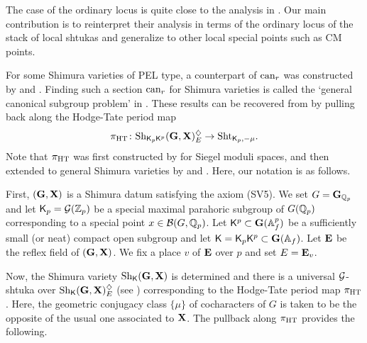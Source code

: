 \documentclass[12pt,reqno]{amsart}
\begin{document}
\begin{rmk}
    The case of the ordinary locus is quite close to the analysis in \cite[{}3.3.6]{BP21}. Our main contribution is to reinterpret their analysis in terms of the ordinary locus of the stack of local shtukas and generalize to other local special points such as CM points. 
\end{rmk}

For some Shimura varieties of PEL type, a counterpart of ${\operatorname{can}}_r$ was constructed by \cite[Theorem A]{GK12} and \cite[Théorème 8]{Far11}. Finding such a section ${\operatorname{can}}_r$ for Shimura varieties is called the `general canonical subgroup problem' in \cite[Introduction]{GK12}. These results can be recovered from  by pulling back along the Hodge-Tate period map
\[
    \pi_{\operatorname{HT}} \colon {\operatorname{Sh}}_{{\mathsf{K}}_p {\mathsf{K}}^p}(\mathbf{G}, \mathbf{X})_E^\diamondsuit \to {\operatorname{Sht}}_{{\mathsf{K}}_p, -\mu}. 
\]
Note that $\pi_{\operatorname{HT}}$ was first constructed by \cite{Sch15} for Siegel moduli spaces, and then extended to general Shimura varieties by \cite{CS17} and \cite{PR24}. Here, our notation is as follows. 

First, $(\mathbf{G}, \mathbf{X})$ is a Shimura datum satisfying the axiom (SV5). We set $G = \mathbf{G}_{\mathbb{Q}_p}$ and let ${\mathsf{K}}_p = {\mathcal{G}}(\mathbb{Z}_p)$ be a special maximal parahoric subgroup of $G(\mathbb{Q}_p)$ corresponding to a special point $x \in {\mathcal{B}}(G, \mathbb{Q}_p)$. Let ${\mathsf{K}}^p\subset \mathbf{G}(\mathbb{A}^p_f)$ be a sufficiently small (or neat) compact open subgroup and let ${\mathsf{K}} = {\mathsf{K}}_p{\mathsf{K}}^p \subset \mathbf{G}(\mathbb{A}_f)$. Let $\mathbf{E}$ be the reflex field of $(\mathbf{G},\mathbf{X})$. We fix a place $v$ of $\mathbf{E}$ over $p$ and set $E=\mathbf{E}_v$. 

Now, the Shimura variety ${\operatorname{Sh}}_{\mathsf{K}}(\mathbf{G},\mathbf{X})$ is determined and there is a universal ${\mathcal{G}}$-shtuka over ${\operatorname{Sh}}_{\mathsf{K}}(\mathbf{G},\mathbf{X})_E^\diamondsuit$ (see \cite[Proposition 4.1.2]{PR24}) corresponding to the Hodge-Tate period map $\pi_{\operatorname{HT}}$. Here, the geometric conjugacy class $\{\mu\}$ of cocharacters of $G$ is taken to be the opposite of the usual one associated to $\mathbf{X}$. The pullback along $\pi_{\operatorname{HT}}$ provides the following.
\end{document}
